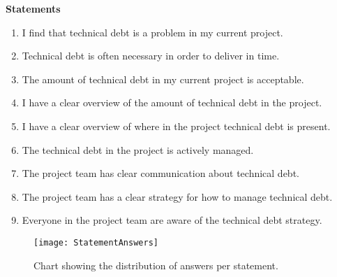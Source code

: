 \textbf{Statements}
\begin{enumerate}[label=\alph*)]
  \item I find that technical debt is a problem in my current project.
  \item Technical debt is often necessary in order to deliver in time.
  \item The amount of technical debt in my current project is acceptable.
  \item I have a clear overview of the amount of technical debt in the project.
  \item I have a clear overview of where in the project technical debt is present.
  \item The technical debt in the project is actively managed.
  \item The project team has clear communication about technical debt.
  \item The project team has a clear strategy for how to manage technical debt.
  \item Everyone in the project team are aware of the technical debt strategy.
\end{enumerate}
\begin{figure}[H]
  \texttt{[image: StatementAnswers]}
  \caption[StatementResults]{Chart showing the distribution of answers per statement.}
  \label{fig:statementresult}
  \centering
\end{figure}